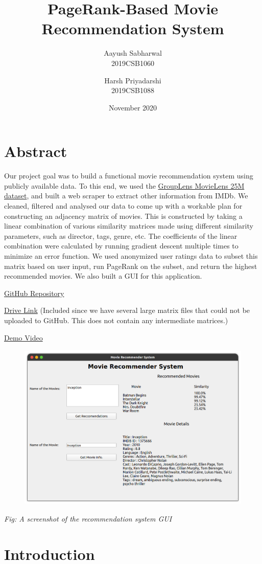 \documentclass[11pt]{article}
\title{PageRank-Based Movie Recommendation System}
\author{
        Aayush Sabharwal\\
        2019CSB1060
        \and
        Harsh Priyadarshi\\
        2019CSB1088
    }
\date{November 2020}
\begin{document}
    
    \maketitle
    
    

    
    \hypertarget{abstract}{%
\section{Abstract}\label{abstract}}

Our project goal was to build a functional movie recommendation system
using publicly available data. To this end, we used the
\href{https://grouplens.org/datasets/movielens/}{GroupLens MovieLens 25M
dataset}, and built a web scraper to extract other information from
IMDb. We cleaned, filtered and analysed our data to come up with a
workable plan for constructing an adjacency matrix of movies. This is
constructed by taking a linear combination of various similarity
matrices made using different similarity parameters, such as director,
tags, genre, etc. The coefficients of the linear combination were
calculated by running gradient descent multiple times to minimize an
error function. We used anonymized user ratings data to subset this
matrix based on user input, run PageRank on the subset, and return the
highest recommended movies. We also built a GUI for this application.

\href{https://github.com/AayushSabharwal/recommender-system}{GitHub
Repository}

\href{https://drive.google.com/file/d/1e2L14HxKfuI4LJUIBTAo6CSgmtm1x7se/view?usp=sharing}{Drive
Link} (Included since we have several large matrix files that could not
be uploaded to GitHub. This does not contain any intermediate matrices.)

\href{https://youtu.be/CDz3vVZKoCM}{Demo Video}

\begin{figure}
    \centering
    \includegraphics[height=8cm]{gui.png}
\end{figure}
\begin{center}
    \textit{Fig: A screenshot of the recommendation system GUI}
\end{center}
    \hypertarget{introduction}{%
\section{Introduction}\label{introduction}}
\end{document}
